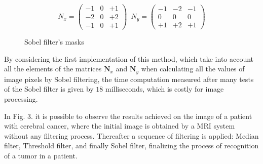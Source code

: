 \documentclass[journal]{IEEEtran}
\begin{document}
\begin{figure}
\[
N_{x}=\left(\begin{array}{ccc}
-1 & 0 & +1 \\
-2 & 0 & +2 \\
-1 & 0 & +1
\end{array}\right)\,\,\, N_{y}=\left(\begin{array}{ccc}
-1 & -2 & -1 \\
 0 &  0 &  0 \\
+1 & +2 & +1
\end{array}\right)
\]
\caption{Sobel filter's masks}
\end{figure}

By considering the first implementation of this method, which take into account all the elements of the matrices \textit{$\mathbf{N}_{x}$} and \textit{$\mathbf{N}_{y}$} when calculating all the values of image pixels by Sobel filtering, the time computation measured after many tests of the Sobel filter is given by \(18\) milliseconds, which is costly for image processing.

In Fig. 3. it is possible to observe the results achieved on the image of a patient with cerebral cancer, where the initial image is obtained by a MRI system without any filtering process. Thereafter a sequence of filtering is applied: Median filter, Threshold filter, and finally Sobel filter, finalizing the process of recognition of a tumor in a patient.
\end{document}
